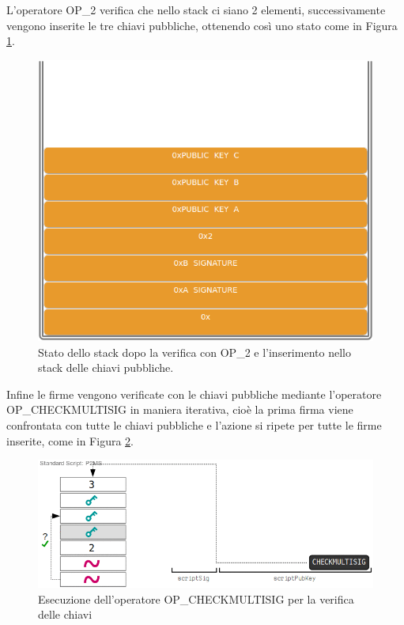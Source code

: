L’operatore OP\_2 verifica che nello stack ci siano 2 elementi, successivamente vengono inserite le tre chiavi pubbliche, ottenendo così uno stato come in Figura \ref{fig:stackmultsing02}.

\begin{figure}[h]
\begin{center}
\includegraphics[width=0.6\columnwidth]{images/script/multisig/2.png}
\end{center}
\caption{Stato dello stack dopo la verifica con OP\_2 e l’inserimento nello stack delle chiavi pubbliche.}
\label{fig:stackmultsing02}
\end{figure}

Infine le firme vengono verificate con le chiavi pubbliche mediante l’operatore OP\_CHECKMULTISIG in maniera iterativa, cioè la prima firma viene confrontata con tutte le chiavi pubbliche e l’azione si ripete per tutte le firme inserite, come in Figura \ref{fig:stackmultsing03}.

\begin{figure}[H]
\includegraphics[width=1\columnwidth]{images/script/multisig/3.png}
\caption{Esecuzione dell’operatore OP\_CHECKMULTISIG per la verifica delle chiavi \cite{learnmeabitcoin:p2ms}}
\label{fig:stackmultsing03}
\end{figure}

